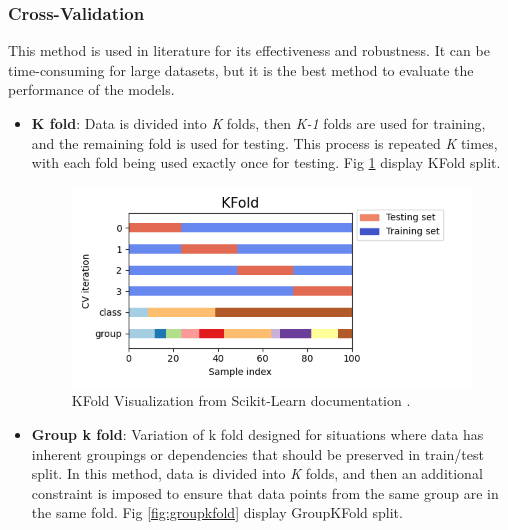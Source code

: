             \subsubsection{Cross-Validation}
                
                This method is used in literature for its effectiveness and robustness. It can be time-consuming for large datasets, but it is the best method to evaluate the performance of the models.

                \begin{itemize}

                    \item \textbf{K fold}: Data is divided into \textit{K} folds, then \textit{K-1} folds are used for training, and the remaining fold is used for testing. This process is repeated \textit{K} times, with each fold being used exactly once for testing. Fig \ref{fig:kfold} display KFold split.
                    
                    \begin{figure}[H]
                        \centering
                        \includegraphics[width=1.0\textwidth]{../src/resources/images/other/kfold.png}
                        \caption{
                          KFold Visualization from Scikit-Learn documentation \cite{scikit-learn}.
                        }
                        \label{fig:kfold}
                    \end{figure}

                    \item \textbf{Group k fold}: Variation of k fold designed for situations where data has inherent groupings or dependencies that should be preserved in train/test split. In this method, data is divided into \textit{K} folds, and then an additional constraint is imposed to ensure that data points from the same group are in the same fold. Fig \ref{fig:groupkfold} display GroupKFold split.
                    

\end{itemize}

